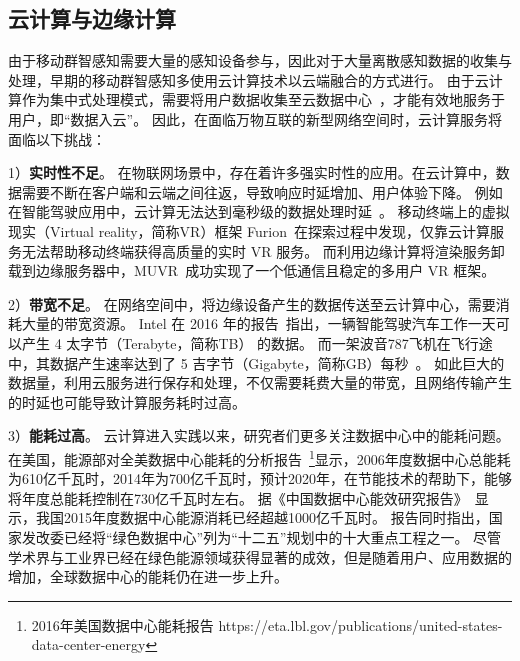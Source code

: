 \subsection{云计算与边缘计算}

由于移动群智感知需要大量的感知设备参与，因此对于大量离散感知数据的收集与处理，早期的移动群智感知多使用云计算技术以云端融合的方式进行。
由于云计算作为集中式处理模式，需要将用户数据收集至云数据中心~\cite{DBLP:conf/icdcs/Montresor16}，才能有效地服务于用户，即“数据入云”。
因此，在面临万物互联的新型网络空间时，云计算服务将面临以下挑战：


1）\textbf{实时性不足}。
在物联网场景中，存在着许多强实时性的应用。在云计算中，数据需要不断在客户端和云端之间往返，导致响应时延增加、用户体验下降。
例如在智能驾驶应用中，云计算无法达到毫秒级的数据处理时延~\cite{DBLP:conf/cvpr/GeigerLU12}。
移动终端上的虚拟现实（Virtual reality，简称VR）框架 Furion~\cite{DBLP:conf/mobicom/LaiHCSD17}在探索过程中发现，仅靠云计算服务无法帮助移动终端获得高质量的实时 VR 服务。
而利用边缘计算将渲染服务卸载到边缘服务器中，MUVR~\cite{DBLP:conf/edge/LiG18}成功实现了一个低通信且稳定的多用户 VR 框架。

2）\textbf{带宽不足}。
在网络空间中，将边缘设备产生的数据传送至云计算中心，需要消耗大量的带宽资源。
Intel 在 2016 年的报告~\cite{DBLP:journals/micro/KatoTINTH15}指出，一辆智能驾驶汽车工作一天可以产生 4 太字节（Terabyte，简称TB） 的数据。
而一架波音787飞机在飞行途中，其数据产生速率达到了 5 吉字节（Gigabyte，简称GB）每秒~\cite{JCRD/shi17}。
如此巨大的数据量，利用云服务进行保存和处理，不仅需要耗费大量的带宽，且网络传输产生的时延也可能导致计算服务耗时过高。

3）\textbf{能耗过高}。
云计算进入实践以来，研究者们更多关注数据中心中的能耗问题。
在美国，能源部对全美数据中心能耗的分析报告~\footnote{2016年美国数据中心能耗报告 https://eta.lbl.gov/publications/united-states-data-center-energy}显示，2006年度数据中心总能耗为610亿千瓦时，2014年为700亿千瓦时，预计2020年，在节能技术的帮助下，能够将年度总能耗控制在730亿千瓦时左右。
据《中国数据中心能效研究报告》~\cite{whitebooks/cn15}显示，我国2015年度数据中心能源消耗已经超越1000亿千瓦时。
报告同时指出，国家发改委已经将“绿色数据中心”列为“十二五”规划中的十大重点工程之一。
尽管学术界与工业界已经在绿色能源领域获得显著的成效，但是随着用户、应用数据的增加，全球数据中心的能耗仍在进一步上升。



